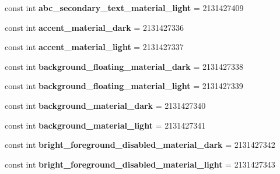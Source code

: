 \begin{DoxyCompactItemize}
const int {\bfseries abc\+\_\+secondary\+\_\+text\+\_\+material\+\_\+light} = 2131427409
\item 
\mbox{\label{class_pinned_app_1_1_droid_1_1_resource_1_1_color_aa1c767902e7b28d5b260ab903a6b39c3}} 
const int {\bfseries accent\+\_\+material\+\_\+dark} = 2131427336
\item 
\mbox{\label{class_pinned_app_1_1_droid_1_1_resource_1_1_color_a504a7b2f72017f954f2297411bec78f3}} 
const int {\bfseries accent\+\_\+material\+\_\+light} = 2131427337
\item 
\mbox{\label{class_pinned_app_1_1_droid_1_1_resource_1_1_color_a282e49f4f39d05197f10ba2c940aeaa8}} 
const int {\bfseries background\+\_\+floating\+\_\+material\+\_\+dark} = 2131427338
\item 
\mbox{\label{class_pinned_app_1_1_droid_1_1_resource_1_1_color_a01a48d77a7711f1abdf5cc7449d8abb2}} 
const int {\bfseries background\+\_\+floating\+\_\+material\+\_\+light} = 2131427339
\item 
\mbox{\label{class_pinned_app_1_1_droid_1_1_resource_1_1_color_ac1b01be274b90d3fd5812022a0ab2ec4}} 
const int {\bfseries background\+\_\+material\+\_\+dark} = 2131427340
\item 
\mbox{\label{class_pinned_app_1_1_droid_1_1_resource_1_1_color_ab17065bdcc580acc8d1454a1f0e85750}} 
const int {\bfseries background\+\_\+material\+\_\+light} = 2131427341
\item 
\mbox{\label{class_pinned_app_1_1_droid_1_1_resource_1_1_color_af68ea54130e6209ddf5a51cf876da75e}} 
const int {\bfseries bright\+\_\+foreground\+\_\+disabled\+\_\+material\+\_\+dark} = 2131427342
\item 
\mbox{\label{class_pinned_app_1_1_droid_1_1_resource_1_1_color_a31d7b6521741501ad8ff2e19e9651945}} 
const int {\bfseries bright\+\_\+foreground\+\_\+disabled\+\_\+material\+\_\+light} = 2131427343

\end{DoxyCompactItemize}
